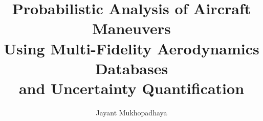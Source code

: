 \documentclass{report}
\begin{document}
\title{Probabilistic Analysis of Aircraft Maneuvers \\
            Using Multi-Fidelity Aerodynamics Databases \\
            and Uncertainty Quantification}
\author{Jayant Mukhopadhaya}
 
\beforepreface





\afterpreface
















\end{document}
